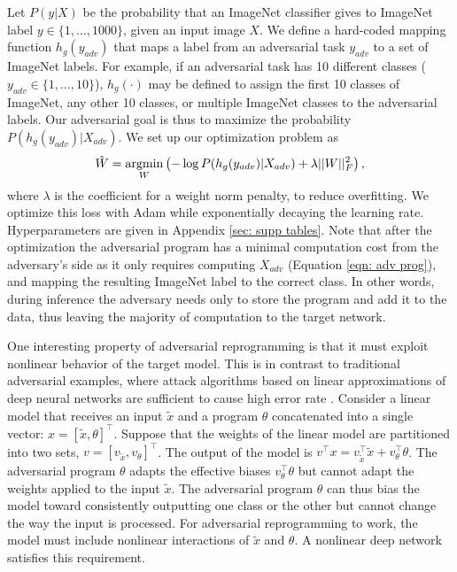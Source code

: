 \documentclass{article}
\newcommand{\argmin}{\operatornamewithlimits{argmin}}
\newcommand{\jcom}[1]{{\textcolor{darkgreen}{[Jascha: #1]}}}
\begin{document}
Let $P(y | X)$ be the probability that an ImageNet classifier gives to ImageNet label $y \in \{1, \hdots, 1000\}$, given an input image $X$. We define a hard-coded mapping function $h_g(y_{adv})$ that maps a label from an adversarial task $y_{adv}$ to a set of ImageNet labels. For example, if an adversarial task has 10 different classes ($y_{adv} \in \{1, \hdots, 10\}$), $h_g\left(\cdot\right)$ may be defined to assign the first 10 classes of ImageNet, any other 10 classes, or multiple ImageNet classes to the adversarial labels. Our adversarial goal is thus to maximize the probability $P(h_g(y_{adv}) | X_{adv})$. We set up our optimization problem as
\begin{align}
\label{eq adv obj}
\hat{W} = 
\argmin_{W} \left( 
	- \log P(h_g(y_{adv}) | X_{adv}) + \lambda ||W||_F^2
	\right)
,
\end{align}
where $\lambda$ is the coefficient for a weight norm penalty, to reduce overfitting.
We optimize this loss with Adam while exponentially decaying the learning rate. Hyperparameters 
are given in Appendix \ref{sec: supp tables}.
Note that after the optimization the adversarial program has a minimal computation cost from the adversary's side as it only requires computing $X_{adv}$ (Equation \ref{eqn: adv prog}), and mapping the resulting ImageNet label to the correct class. 
In other words, during inference the adversary needs only to store the program and add it to the data, thus leaving the majority of computation to the target network. 

One interesting property of adversarial reprogramming is that it must
exploit nonlinear behavior of the target model.
This is in contrast to traditional adversarial examples, where attack
algorithms based on linear approximations of deep neural networks are
sufficient to cause high error rate \citep{goodfellow2014explaining}.
Consider a linear model that receives an input $\tilde{x}$ and a program
$\theta$ concatenated into a single vector: $x = [\tilde{x}, \theta]^{\top}$.
Suppose that the weights of the linear model are partitioned into two
sets, $v = [v_{\tilde{x}}, v_\theta]^{\top}$.
The output of the model is $v^{\top} x = v_{\tilde{x}}^{\top} \tilde{x} + v_\theta^{\top} \theta$.
The adversarial program $\theta$ adapts the effective biases
$v_\theta^{\top} \theta$ but cannot adapt the weights applied to the input $\tilde{x}$.
The adversarial program $\theta$ can thus bias the model toward consistently outputting one class or
the other but cannot change the way the input is processed.
For adversarial reprogramming to work, the model must include nonlinear interactions of $\tilde{x}$ and $\theta$.
A nonlinear deep network satisfies this requirement.
\end{document}
